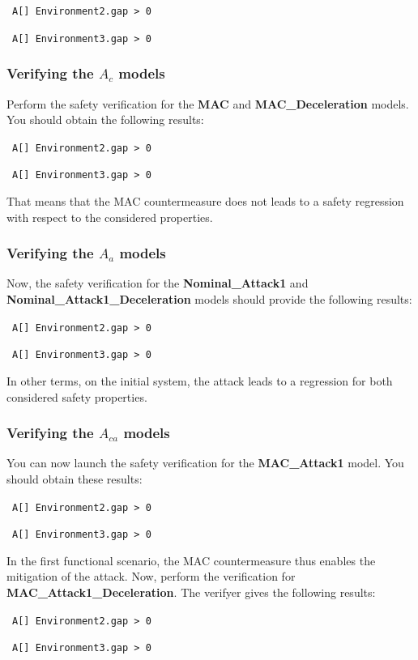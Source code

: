 \documentclass{article}
\newcommand{\cmark}{\textcolor{green}{\textbf{\ding{51}}}}
\newcommand{\xmark}{\textcolor{red}{\textbf{\ding{55}}}}
\begin{document}
\cmark~\verb|A[] Environment2.gap > 0|

\cmark~\verb|A[] Environment3.gap > 0|


\subsubsection{Verifying the $A_c$ models}

Perform the safety verification for the \textbf{MAC} and \textbf{MAC\_Deceleration} models. You should obtain the following results:

\cmark~\verb|A[] Environment2.gap > 0|

\cmark~\verb|A[] Environment3.gap > 0|

That means that the MAC countermeasure does not leads to a safety regression with respect to the considered properties.


\subsubsection{Verifying the $A_a$ models}

Now, the safety verification for the \textbf{Nominal\_Attack1} and \textbf{Nominal\_Attack1\_Deceleration} models should provide the following results:

\xmark~\verb|A[] Environment2.gap > 0|

\xmark~\verb|A[] Environment3.gap > 0|

In other terms, on the initial system, the attack leads to a regression for both considered safety properties.

\subsubsection{Verifying the $A_{c a}$ models}

You can now launch the safety verification for the \textbf{MAC\_Attack1} model. You should obtain these results:

\cmark~\verb|A[] Environment2.gap > 0|

\cmark~\verb|A[] Environment3.gap > 0|

In the first functional scenario, the MAC countermeasure thus enables the mitigation of the attack. Now, perform the verification for \textbf{MAC\_Attack1\_Deceleration}. The verifyer gives the following results:

\xmark~\verb|A[] Environment2.gap > 0|

\xmark~\verb|A[] Environment3.gap > 0|
\end{document}
